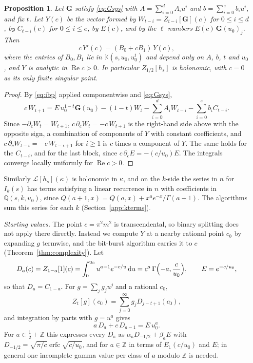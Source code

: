\documentclass[11pt,reqno]{amsart}
\newtheorem{proposition}[theorem]{Proposition}
\theoremstyle{definition}
\theoremstyle{remark}
\newcommand{\erfc}{\operatorname{erfc}}
\newcommand{\dd}{\,\mathrm{d}}
\newcommand{\QQ}{\mathbb{Q}}
\newcommand{\ZZ}{\mathbb{Z}}
\begin{document}
\begin{proposition}\label{prop:dual}
Let $\mathbf G$ satisfy \eqref{eq:Gsys} with $A = \sum_{i=0}^{d}A_iu^i$ and $b = \sum_{i=0}^{e}b_iu^i$, and fix $t$.
Let $Y(c)$ be the vector formed by $W_{t-i} = Z_{t-i}[\mathbf G](c)$ for $0 \le i \le d$, by $C_{t-i}(c)$ for
$0 \le i \le e$, by $E(c)$, and by the $\ell$ numbers $E(c)\,\mathbf G(u_0)_j$. Then
\begin{equation}\label{eq:fuchsys}
  c\,Y'(c) = (B_0 + cB_1)\,Y(c),
\end{equation}
where the entries of $B_0, B_1$ lie in $\mathbb K(s, u_0, u_0^{t})$ and depend only on $A$, $b$, $t$ and $u_0$, and $Y$
is analytic in $\operatorname{Re}c > 0$. In particular $Z_{1/2}[h_s]$ is holonomic, with $c = 0$ as its only finite
singular point.
\end{proposition}

\begin{proof}
By \eqref{eq:ibp} applied componentwise and \eqref{eq:Gsys},
\[
  c\,W_{t+1} = E\,u_0^{1-t}\mathbf G(u_0) - (1-t)W_t - \sum_{i=0}^{d}A_iW_{t-i} - \sum_{i=0}^{e}b_iC_{t-i}.
\]
Since $-\partial_cW_t = W_{t+1}$, $c\,\partial_cW_t = -c\,W_{t+1}$ is the right-hand side above with the opposite sign, a
combination of components of $Y$ with constant coefficients, and $c\,\partial_cW_{t-i} = -c\,W_{t-i+1}$ for $i \ge 1$ is
$c$ times a component of $Y$. The same holds for the $C_{t-i}$, and for the last block, since
$c\,\partial_cE = -(c/u_0)E$. The integrals converge locally uniformly for $\operatorname{Re}c > 0$.
\end{proof}

Similarly $\mathcal L[h_s](\kappa)$ is holonomic in $\kappa$, and on the $k$-side the series in $n$
for $I_k(s)$ has terms satisfying a linear recurrence in $n$ with coefficients in $\QQ(s,k,u_0)$, since
$Q(a+1,x) = Q(a,x) + x^ae^{-x}/\Gamma(a+1)$. The algorithms sum this series for each $k$ (Section~\ref{app:kterms}).

\emph{Starting values.} The point $c = \pi^2m^2$ is transcendental, so binary splitting does not apply there
directly. Instead we compute $Y$ at a nearby rational point $c_0$ by expanding $g$ termwise, and the bit-burst algorithm
carries it to $c$ (Theorem~\ref{thm:complexity}). Let
\[
  D_a(c) = Z_{1-a}[1](c) = \int_0^{u_0}u^{a-1}e^{-c/u}\dd u = c^a\,\Gamma\Bigl(-a, \frac{c}{u_0}\Bigr), \qquad E = e^{-c/u_0},
\]
so that $D_a = C_{1-a}$. For $g = \sum_jg_ju^j$ and a rational $c_0$,
\begin{equation}\label{eq:startvals}
  Z_t[g](c_0) = \sum_{j=0}^{\infty}g_jD_{j-t+1}(c_0),
\end{equation}
and integration by parts with $g = u^a$ gives
\begin{equation}\label{eq:Drec}
  a\,D_a + c\,D_{a-1} = E\,u_0^a .
\end{equation}
For $a \in \frac12 + \ZZ$ this expresses every $D_a$ as $\alpha_aD_{-1/2} + \beta_aE$ with
$D_{-1/2} = \sqrt{\pi/c}\erfc\sqrt{c/u_0}$, and for $a \in \ZZ$ in terms of $E_1(c/u_0)$ and $E$; in general one
incomplete gamma value per class of $a$ modulo $\ZZ$ is needed.
\end{document}
